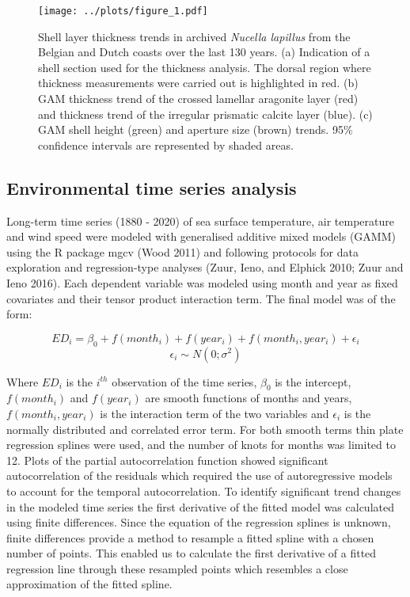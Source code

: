 \documentclass[smallextended]{svjour3}       %
\begin{document}
\begin{figure}
\centering
\texttt{[image: ../plots/figure\_1.pdf]}
\caption{Shell layer thickness trends in archived \emph{Nucella
lapillus} from the Belgian and Dutch coasts over the last 130 years. (a)
Indication of a shell section used for the thickness analysis. The
dorsal region where thickness measurements were carried out is
highlighted in red. (b) GAM thickness trend of the crossed lamellar
aragonite layer (red) and thickness trend of the irregular prismatic
calcite layer (blue). (c) GAM shell height (green) and aperture size
(brown) trends. 95\% confidence intervals are represented by shaded
areas.}
\end{figure}

\hypertarget{environmental-time-series-analysis}{%
\subsection{Environmental time series
analysis}\label{environmental-time-series-analysis}}

Long-term time series (1880 - 2020) of sea surface temperature, air
temperature and wind speed were modeled with generalised additive mixed
models (GAMM) using the R package mgcv (Wood 2011) and following
protocols for data exploration and regression-type analyses (Zuur, Ieno,
and Elphick 2010; Zuur and Ieno 2016). Each dependent variable was
modeled using month and year as fixed covariates and their tensor
product interaction term. The final model was of the form:

\[
ED_i = \beta_0 + f(month_i) + f(year_i) + f(month_i, year_i) + \epsilon_i
\] \[
\epsilon_i \sim N(0; \sigma^2)
\]

Where \(ED_i\) is the \(i^{th}\) observation of the time series,
\(\beta_0\) is the intercept, \(f(month_i)\) and \(f(year_i)\) are
smooth functions of months and years, \(f(month_i, year_i)\) is the
interaction term of the two variables and \(\epsilon_i\) is the normally
distributed and correlated error term. For both smooth terms thin plate
regression splines were used, and the number of knots for months was
limited to 12. Plots of the partial autocorrelation function showed
significant autocorrelation of the residuals which required the use of
autoregressive models to account for the temporal autocorrelation. To
identify significant trend changes in the modeled time series the first
derivative of the fitted model was calculated using finite differences.
Since the equation of the regression splines is unknown, finite
differences provide a method to resample a fitted spline with a chosen
number of points. This enabled us to calculate the first derivative of a
fitted regression line through these resampled points which resembles a
close approximation of the fitted spline.
\end{document}
